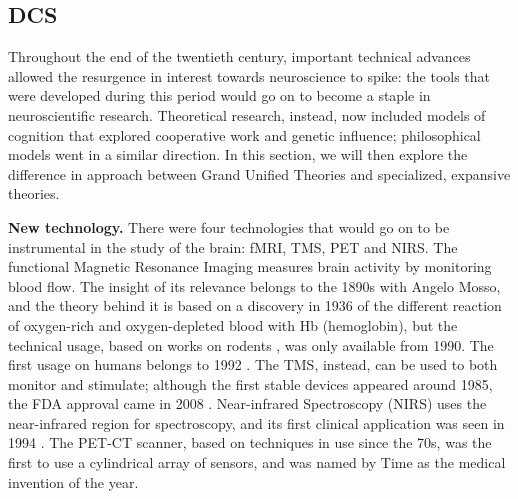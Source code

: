 \documentclass[../main.tex]{subfiles}
\begin{document}
\subsection{DCS}
Throughout the end of the twentieth century, important technical advances allowed the resurgence in interest towards neuroscience to spike: the tools that were developed during this period would go on to become a staple in neuroscientific research. Theoretical research, instead, now included models of cognition that explored cooperative work and genetic influence; philosophical models went in a similar direction. In this section, we will then explore the difference in approach between Grand Unified Theories and specialized, expansive theories.

\vspace{4pt}
\textbf{New technology.} There were four technologies that would go on to be instrumental in the study of the brain: fMRI, TMS, PET and NIRS. The functional Magnetic Resonance Imaging measures brain activity by monitoring blood flow. The insight of its relevance belongs to the 1890s with Angelo Mosso, and the theory behind it is based on a discovery in 1936 of the different reaction of oxygen-rich and oxygen-depleted blood with Hb (hemoglobin), but the technical usage, based on works on rodents \parencite{thulbornRoleFerritinHemosiderin1990} \parencite{ogawaBrainMagneticResonance1990}, was only available from 1990. The first usage on humans belongs to 1992 \parencite{kwongDynamicMagneticResonance1992}. The TMS, instead, can be used to both monitor and stimulate; although the first stable devices appeared around 1985, the FDA approval came in 2008 \parencite{horvathTranscranialMagneticStimulation2011}. Near-infrared Spectroscopy (NIRS) uses the near-infrared region for spectroscopy, and its first clinical application was seen in 1994 \parencite{ferrariBriefReviewHistory2012}. The PET-CT scanner, based on techniques in use since the 70s, was the first to use a cylindrical array of sensors, and was named by Time as the medical invention of the year.
\end{document}
